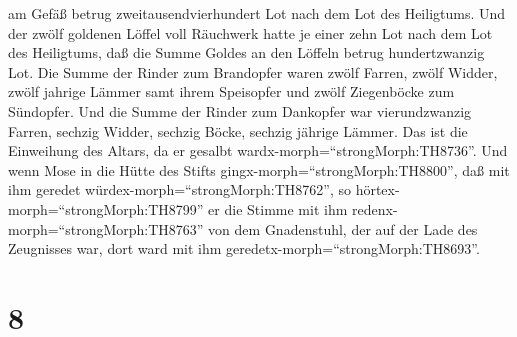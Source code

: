 am Gefäß betrug zweitausendvierhundert Lot nach dem Lot des Heiligtums.
 Und der zwölf goldenen Löffel voll Räuchwerk hatte je
einer zehn Lot nach dem Lot des Heiligtums, daß die Summe Goldes an den
Löffeln betrug hundertzwanzig Lot.  Die Summe der Rinder
zum Brandopfer waren zwölf Farren, zwölf Widder, zwölf jahrige Lämmer
samt ihrem Speisopfer und zwölf Ziegenböcke zum Sündopfer. 
Und die Summe der Rinder zum Dankopfer war vierundzwanzig Farren,
sechzig Widder, sechzig Böcke, sechzig jährige Lämmer. Das ist die
Einweihung des Altars, da er gesalbt wardx-morph=``strongMorph:TH8736''.
 Und wenn Mose in die Hütte des Stifts
gingx-morph=``strongMorph:TH8800'', daß mit ihm geredet
würdex-morph=``strongMorph:TH8762'', so
hörtex-morph=``strongMorph:TH8799'' er die Stimme mit ihm
redenx-morph=``strongMorph:TH8763'' von dem Gnadenstuhl, der auf der
Lade des Zeugnisses war, dort ward mit ihm
geredetx-morph=``strongMorph:TH8693''.

\hypertarget{section-7}{%
\section{8}\label{section-7}}

